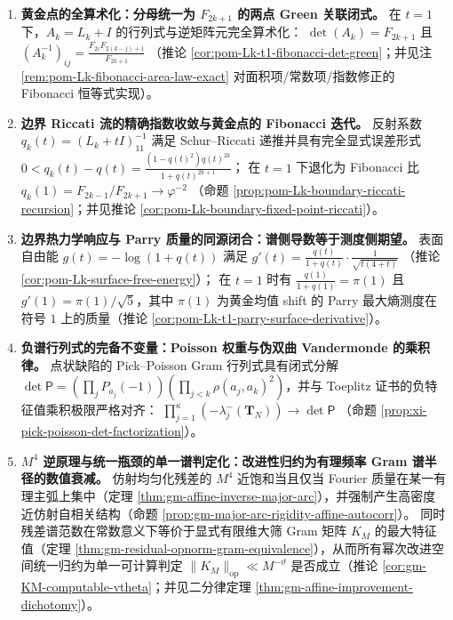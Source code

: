 \begin{enumerate}
  \item \textbf{黄金点的全算术化：分母统一为 \texorpdfstring{$F_{2k+1}$}{F_{2k+1}} 的两点 Green 关联闭式。}
  在 \(t=1\) 下，\(A_k=L_k+I\) 的行列式与逆矩阵元完全算术化：
  \(\det(A_k)=F_{2k+1}\) 且
  \((A_k^{-1})_{ij}=\frac{F_{2i}F_{2(k-j)+1}}{F_{2k+1}}\)
  （推论 \ref{cor:pom-Lk-t1-fibonacci-det-green}；并见注 \ref{rem:pom-Lk-fibonacci-area-law-exact} 对面积项/常数项/指数修正的 Fibonacci 恒等式实现）。

  \item \textbf{边界 Riccati 流的精确指数收敛与黄金点的 Fibonacci 迭代。}
  反射系数 \(q_k(t)=(L_k+tI)^{-1}_{11}\) 满足 Schur--Riccati 递推并具有完全显式误差形式
  \(0<q_k(t)-q(t)=\frac{(1-q(t)^2)q(t)^{2k}}{1+q(t)^{2k+1}}\)；
  在 \(t=1\) 下退化为 Fibonacci 比
  \(q_k(1)=F_{2k-1}/F_{2k+1}\to\varphi^{-2}\)
  （命题 \ref{prop:pom-Lk-boundary-riccati-recursion}；并见推论 \ref{cor:pom-Lk-boundary-fixed-point-riccati}）。

  \item \textbf{边界热力学响应与 Parry 质量的同源闭合：谱侧导数等于测度侧期望。}
  表面自由能 \(g(t)=-\log(1+q(t))\) 满足
  \(g'(t)=\frac{q(t)}{1+q(t)}\cdot\frac{1}{\sqrt{t(4+t)}}\)
  （推论 \ref{cor:pom-Lk-surface-free-energy}）；
  在 \(t=1\) 时有
  \(\frac{q(1)}{1+q(1)}=\pi(1)\) 且 \(g'(1)=\pi(1)/\sqrt5\)，其中 \(\pi(1)\) 为黄金均值 shift 的 Parry 最大熵测度在符号 \(1\) 上的质量（推论 \ref{cor:pom-Lk-t1-parry-surface-derivative}）。

  \item \textbf{负谱行列式的完备不变量：Poisson 权重与伪双曲 Vandermonde 的乘积律。}
  点状缺陷的 Pick--Poisson Gram 行列式具有闭式分解
  \(
  \det\mathsf P=(\prod_j P_{a_j}(-1))(\prod_{j<k}\rho(a_j,a_k)^2)
  \)，并与 Toeplitz 证书的负特征值乘积极限严格对齐：
  \(\prod_{j=1}^{\kappa}(-\lambda_j^-(\mathbf{T}_N))\to\det\mathsf P\)
  （命题 \ref{prop:xi-pick-poisson-det-factorization}）。

  \item \textbf{\texorpdfstring{$M^4$}{M^4} 逆原理与统一瓶颈的单一谱判定化：改进性归约为有理频率 Gram 谱半径的数值衰减。}
  仿射均匀化残差的 \(M^4\) 近饱和当且仅当 Fourier 质量在某一有理主弧上集中（定理 \ref{thm:gm-affine-inverse-major-arc}），并强制产生高密度近仿射自相关结构（命题 \ref{prop:gm-major-arc-rigidity-affine-autocorr}）。
  同时残差谱范数在常数意义下等价于显式有限维大筛 Gram 矩阵 \(K_M\) 的最大特征值（定理 \ref{thm:gm-residual-opnorm-gram-equivalence}），从而所有幂次改进空间统一归约为单一可计算判定
  \(
  \|K_M\|_{\mathrm{op}}\ll M^{-\vartheta}
  \)
  是否成立（推论 \ref{cor:gm-KM-computable-vtheta}；并见二分律定理 \ref{thm:gm-affine-improvement-dichotomy}）。
\end{enumerate}


